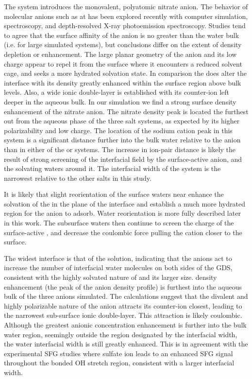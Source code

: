 The \sodnit system introduces the monovalent, polyatomic nitrate anion. The behavior of molecular anions such as \nit at \airwat has been explored recently with computer simulation,\cite{Thomas2007,Miller2009} spectroscopy,\cite{Soule2007,Xu2009,Otten2007} and depth-resolved X-ray photoemission spectroscopy.\cite{Brown2009} Studies tend to agree that the \airwat surface affinity of the \nit anion is no greater than the water bulk (i.e. for large simulated systems), but conclusions differ on the extent of density depletion or enhancement. The large planar geometry of the \nit anion and its low charge appear to repel it from the \airwat surface where it encounters a reduced solvent cage, and seeks a more hydrated solvation state. In comparison the \nit does alter the \ctcwat interface with its density greatly enhanced within the surface region above bulk levels. Also, a wide ionic double-layer is established with its counter-ion left deeper in the aqueous bulk. In our simulation we find a strong surface density enhancement of the nitrate anion. The nitrate density peak is located the furthest out from the aqueous phase of the three salt systems, as expected by its higher polarizability and low charge. The location of the sodium cation peak in this system is a significant distance further into the bulk water relative to the anion than in either of the \nacl or \sodsul systems. The increase in ion-pair distance is likely the result of strong screening of the interfacial field by the surface-active anion, and the solvating waters around it. The interfacial width of the \sodnit system is the narrowest relative to the other salts in this study. 

It is likely that slight reorientation of the surface waters near \ctc enhance the solvation of the \nit in the plane of the interface and establish a much more hydrated region for the anion to adsorb. Water reorientation is more fully described later in this work. The subsurface waters then continue to screen the charge of the surface-active \nit, and decrease the coulombic force pulling the cation closer to the surface. 

The widest interface is that of the \sodsul solution, indicating that the \sul anions act to increase the number of interfacial water molecules on both sides of the GDS, consistent with the highly solvated nature of \sul and its larger size. \sul density enhancement (the peak of the anion density profile) is furthest into the aqueous bulk of the three anions simulated. The calculations suggest that the divalent and highly polarizable nature of the \sul anion attracts its counter-ion closest, leading to the narrowest sub-surface ionic double-layer. This attraction is likely coulombic. Although the greatest anionic concentration enhancement is further into the bulk water region, seemingly outside the region designated by the interfacial width, the water interfacial width is still greatly enhanced. This is in agreement with the experimental \sodsul SFG studies where sulfate ion leads to an enhanced SFG signal throughout the bonded OH stretch region, consistent with a larger interfacial width.\cite{McFearin2009}

